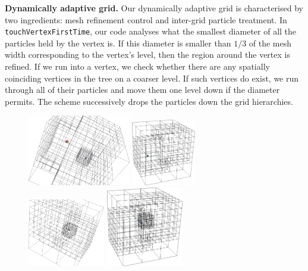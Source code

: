 {\bf Dynamically adaptive grid.}
Our dynamically adaptive grid is characterised by two ingredients: mesh
refinement control and inter-grid particle treatment.
In \texttt{touchVertexFirstTime}, our code analyses what the smallest diameter
of all the particles held by the vertex is.
If this diameter is smaller than $1/3$ of the mesh width corresponding to the
vertex's level, then the region around the vertex is refined.
If we run into a vertex, we check whether there are any spatially coinciding
vertices in the tree on a coarser level.
If such vertices do exist, we run through all of their particles and move them
one level down if the diameter permits.
The scheme successively drops the particles down the grid hierarchies.

\begin{figure}
 \begin{center}
  \includegraphics[width=0.4\textwidth]{experiments/two-bodies/visualisation/adaptive-grid00.png}
  \hspace{1.1cm}
  \includegraphics[width=0.25\textwidth]{experiments/two-bodies/visualisation/reluctant-adaptive-grid00.png}
  \\
  \includegraphics[width=0.3\textwidth]{experiments/two-bodies/visualisation/adaptive-grid02.png}
  \hspace{1.1cm}
  \includegraphics[width=0.3\textwidth]{experiments/two-bodies/visualisation/reluctant-adaptive-grid02.png}

\end{center}
\end{figure}
